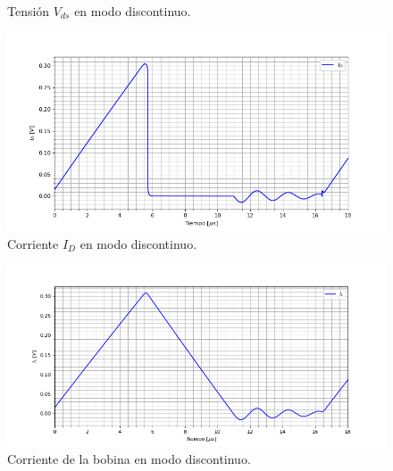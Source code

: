 \begin{figure}
\begin{minipage}{0.495\textwidth}
		\caption{Tensión $V_{ds}$ en modo discontinuo.}
		\label{ej4:fig:vds}
	\end{minipage}\hfill
	\begin{minipage}{0.495\textwidth}
		\centering
		\includegraphics[width=\textwidth]{ImagenesEjercicio-4/id} %
		\caption{Corriente $I_{D}$ en modo discontinuo.}
		\label{ej4:fig:id}
	\end{minipage}
\end{figure} 

\begin{figure}[H]
	\centering
	\includegraphics[width=\linewidth, page=1]{ImagenesEjercicio-4/il}
	\caption{Corriente de la bobina en modo discontinuo.}
	\label{ej4:fig:il}
\end{figure}

